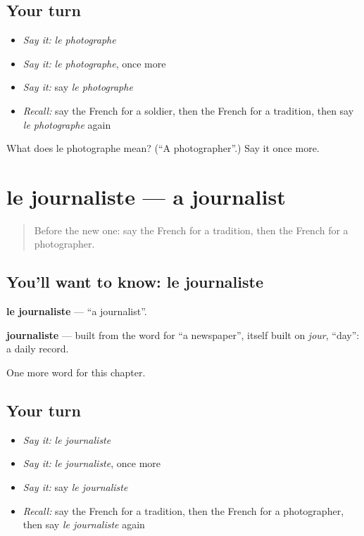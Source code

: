 \subsection*{Your turn}
\begin{itemize}
\raggedright
  \item \emph{Say it:} \emph{le photographe}
  \item \emph{Say it:} \emph{le photographe}, once more
  \item \emph{Say it:} say \emph{le photographe}
  \item \emph{Recall:} say the French for a soldier, then the French for a tradition, then say \emph{le photographe} again
\end{itemize}

\begin{tcolorbox}[breakable,colback=teal!4,colframe=teal!35!black,title={Before you move on}]
What does le photographe mean? (\textquotedblleft{}A photographer\textquotedblright{}.) Say it once more.
\end{tcolorbox}
\section[le journaliste]{le journaliste — a journalist}

\label{lesson:FR-C166-journaliste}



\begin{quote}
Before the new one: say the French for a tradition, then the French for a photographer.
\end{quote}

\subsection*{You'll want to know: le journaliste}
\textbf{le journaliste} — \textquotedblleft{}a journalist\textquotedblright{}.

\begin{cousinweb}
\textbf{journaliste} — built from the word for \textquotedblleft{}a newspaper\textquotedblright{}, itself built on \emph{jour}, \textquotedblleft{}day\textquotedblright{}: a daily record.
\end{cousinweb}

\begin{grammarlens}[title={What you've built}]
One more word for this chapter.
\end{grammarlens}

\subsection*{Your turn}
\begin{itemize}
\raggedright
  \item \emph{Say it:} \emph{le journaliste}
  \item \emph{Say it:} \emph{le journaliste}, once more
  \item \emph{Say it:} say \emph{le journaliste}
  \item \emph{Recall:} say the French for a tradition, then the French for a photographer, then say \emph{le journaliste} again
\end{itemize}

